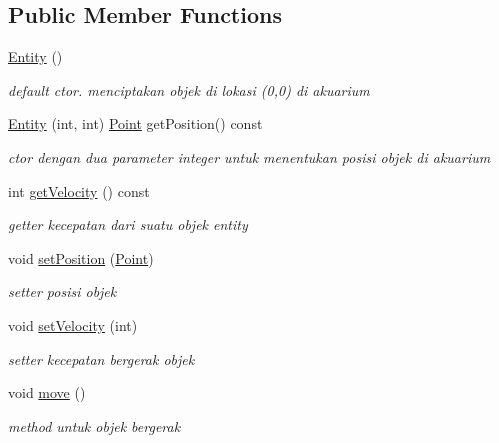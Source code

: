 \subsection*{Public Member Functions}
\begin{DoxyCompactItemize}
\item 
\mbox{\label{classEntity_a980f368aa07ce358583982821533a54a}} 
\hyperlink{classEntity_a980f368aa07ce358583982821533a54a}{Entity} ()
\begin{DoxyCompactList}\small\item\em default ctor. menciptakan objek di lokasi (0,0) di akuarium \end{DoxyCompactList}\item 
\hyperlink{classEntity_a82c4f38635d70e83cbf17332e2abddc6}{Entity} (int, int) \hyperlink{classPoint}{Point} get\+Position() const
\begin{DoxyCompactList}\small\item\em ctor dengan dua parameter integer untuk menentukan posisi objek di akuarium \end{DoxyCompactList}\item 
\mbox{\label{classEntity_ac8e667975506fcad1d4d3f0715c4df51}} 
int \hyperlink{classEntity_ac8e667975506fcad1d4d3f0715c4df51}{get\+Velocity} () const
\begin{DoxyCompactList}\small\item\em getter kecepatan dari suatu objek entity \end{DoxyCompactList}\item 
\mbox{\label{classEntity_a1b9a6d2e14faa42afeea2b57218285fd}} 
void \hyperlink{classEntity_a1b9a6d2e14faa42afeea2b57218285fd}{set\+Position} (\hyperlink{classPoint}{Point})
\begin{DoxyCompactList}\small\item\em setter posisi objek \end{DoxyCompactList}\item 
\mbox{\label{classEntity_ab91bc74ca735bc2172d4eac1ed79ed2a}} 
void \hyperlink{classEntity_ab91bc74ca735bc2172d4eac1ed79ed2a}{set\+Velocity} (int)
\begin{DoxyCompactList}\small\item\em setter kecepatan bergerak objek \end{DoxyCompactList}\item 
\mbox{\label{classEntity_ac1f12a5f7922624ee7ced15be3b884de}} 
void \hyperlink{classEntity_ac1f12a5f7922624ee7ced15be3b884de}{move} ()
\begin{DoxyCompactList}\small\item\em method untuk objek bergerak \end{DoxyCompactList}\end{DoxyCompactItemize}


